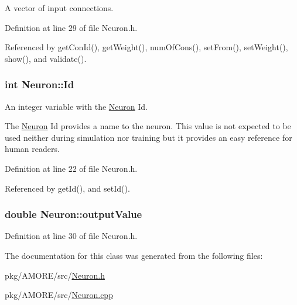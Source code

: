 A vector of input connections. 



Definition at line 29 of file Neuron.h.



Referenced by getConId(), getWeight(), numOfCons(), setFrom(), setWeight(), show(), and validate().

\hypertarget{class_neuron_a72bb327a7c5c865e6748a4e074ce0680}{
\subsubsection[{Id}]{\setlength{\rightskip}{0pt plus 5cm}int {\bf Neuron::Id}}}
\label{class_neuron_a72bb327a7c5c865e6748a4e074ce0680}


An integer variable with the \hyperlink{class_neuron}{Neuron} Id. 

The \hyperlink{class_neuron}{Neuron} Id provides a name to the neuron. This value is not expected to be used neither during simulation nor training but it provides an easy reference for human readers. 

Definition at line 22 of file Neuron.h.



Referenced by getId(), and setId().

\hypertarget{class_neuron_ada029047646c36e525a6a1b77cafc03c}{
\subsubsection[{outputValue}]{\setlength{\rightskip}{0pt plus 5cm}double {\bf Neuron::outputValue}}}
\label{class_neuron_ada029047646c36e525a6a1b77cafc03c}


Definition at line 30 of file Neuron.h.



The documentation for this class was generated from the following files:\begin{DoxyCompactItemize}
\item 
pkg/AMORE/src/\hyperlink{_neuron_8h}{Neuron.h}\item 
pkg/AMORE/src/\hyperlink{_neuron_8cpp}{Neuron.cpp}\end{DoxyCompactItemize}
